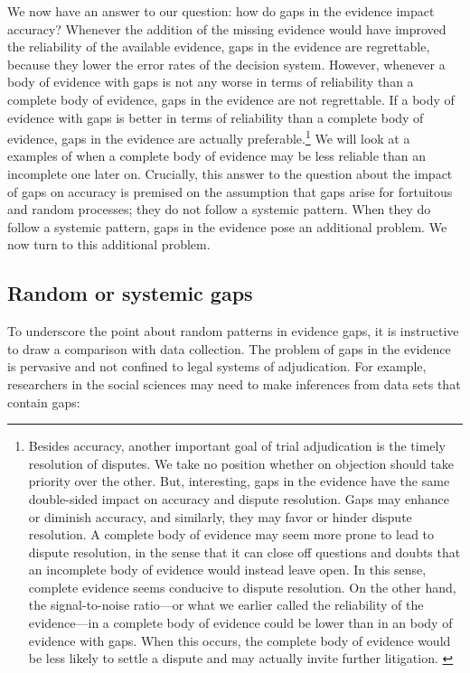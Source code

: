 \documentclass[
  10pt,
  dvipsnames,enabledeprecatedfontcommands]{scrartcl}
\begin{document}
We now have an answer to our question: how do gaps in the evidence
impact accuracy? Whenever the addition of the missing evidence would
have improved the reliability of the available evidence, gaps in the
evidence are regrettable, because they lower the error rates of the
decision system. However, whenever a body of evidence with gaps is not
any worse in terms of reliability than a complete body of evidence, gaps
in the evidence are not regrettable. If a body of evidence with gaps is
better in terms of reliability than a complete body of evidence, gaps in
the evidence are actually preferable.\footnote{Besides accuracy, another
  important goal of trial adjudication is the timely resolution of
  disputes. We take no position whether on objection should take
  priority over the other. But, interesting, gaps in the evidence have
  the same double-sided impact on accuracy and dispute resolution. Gaps
  may enhance or diminish accuracy, and similarly, they may favor or
  hinder dispute resolution. A complete body of evidence may seem more
  prone to lead to dispute resolution, in the sense that it can close
  off questions and doubts that an incomplete body of evidence would
  instead leave open. In this sense, complete evidence seems conducive
  to dispute resolution. On the other hand, the signal-to-noise
  ratio---or what we earlier called the reliability of the evidence---in
  a complete body of evidence could be lower than in an body of evidence
  with gaps. When this occurs, the complete body of evidence would be
  less likely to settle a dispute and may actually invite further
  litigation. \label{footnote:dispute-resolution}} We will look at a
examples of when a complete body of evidence may be less reliable than
an incomplete one later on. Crucially, this answer to the question about
the impact of gaps on accuracy is premised on the assumption that gaps
arise for fortuitous and random processes; they do not follow a systemic
pattern. When they do follow a systemic pattern, gaps in the evidence
pose an additional problem. We now turn to this additional problem.

\hypertarget{random-or-systemic-gaps}{%
\subsection{Random or systemic gaps}\label{random-or-systemic-gaps}}

To underscore the point about random patterns in evidence gaps, it is
instructive to draw a comparison with data collection. The problem of
gaps in the evidence is pervasive and not confined to legal systems of
adjudication. For example, researchers in the social sciences may need
to make inferences from data sets that contain gaps:
\end{document}
